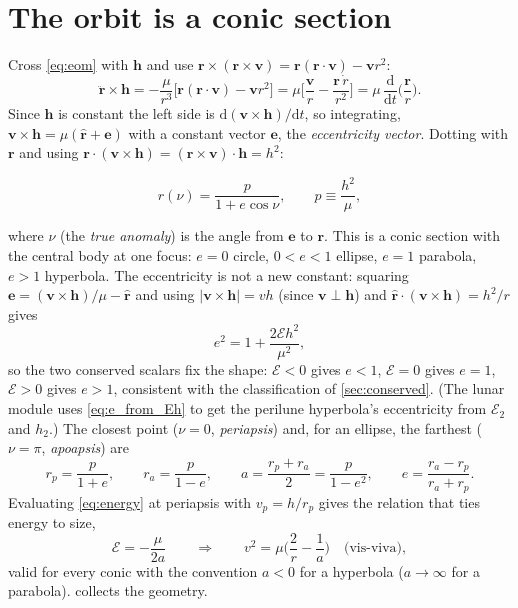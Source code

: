\documentclass[11pt,letterpaper,oneside]{report}
\newcommand{\En}{\mathcal E}
\newcommand{\dd}{\mathrm{d}}
\newcommand{\bv}[1]{\bm{#1}}
\newcommand{\uv}[1]{\hat{\bm{#1}}}
\begin{document}
\section{The orbit is a conic section}
Cross \cref{eq:eom} with $\bv h$ and use $\bv r\times(\bv r\times\bv v)=\bv r(\bv r\cdot\bv v)-\bv v r^2$:
\[
\ddot{\bv r}\times\bv h = -\frac{\mu}{r^3}\big[\bv r(\bv r\cdot\bv v)-\bv v r^2\big]
= \mu\Big[\frac{\bv v}{r}-\frac{\bv r\,\dot r}{r^2}\Big] = \mu\,\frac{\dd}{\dd t}\Big(\frac{\bv r}{r}\Big).
\]
Since $\bv h$ is constant the left side is $\dd(\bv v\times\bv h)/\dd t$, so integrating,
$\bv v\times\bv h = \mu(\uv r+\bv e)$ with a constant vector $\bv e$, the \emph{eccentricity
vector}. Dotting with $\bv r$ and using $\bv r\cdot(\bv v\times\bv h)=(\bv r\times\bv v)\cdot\bv h=h^2$:
\begin{keyresult}
\begin{equation}
  r(\nu)=\frac{p}{1+e\cos\nu},\qquad p\equiv\frac{h^2}{\mu},
  \label{eq:conic}
\end{equation}
\end{keyresult}
where $\nu$ (the \emph{true anomaly}) is the angle from $\bv e$ to $\bv r$. This is a conic section
with the central body at one focus: $e=0$ circle, $0<e<1$ ellipse, $e=1$ parabola, $e>1$
hyperbola. The eccentricity is not a new constant: squaring $\bv e=(\bv v\times\bv h)/\mu-\uv r$
and using $|\bv v\times\bv h|=vh$ (since $\bv v\perp\bv h$) and $\uv r\cdot(\bv v\times\bv h)=h^2/r$ gives
\begin{equation}
  e^2=1+\frac{2\En h^2}{\mu^2},
  \label{eq:e_from_Eh}
\end{equation}
so the two conserved scalars fix the shape: $\En<0$ gives $e<1$, $\En=0$ gives $e=1$, $\En>0$ gives
$e>1$, consistent with the classification of \cref{sec:conserved}. (The lunar module uses
\cref{eq:e_from_Eh} to get the perilune hyperbola's eccentricity from $\En_2$ and $h_2$.) The closest point ($\nu=0$, \emph{periapsis}) and, for an ellipse, the farthest
($\nu=\pi$, \emph{apoapsis}) are
\begin{equation}
  r_p=\frac{p}{1+e},\qquad r_a=\frac{p}{1-e},\qquad a=\frac{r_p+r_a}{2}=\frac{p}{1-e^2},\qquad
  e=\frac{r_a-r_p}{r_a+r_p}.
\end{equation}
Evaluating \cref{eq:energy} at periapsis with $v_p=h/r_p$ gives the relation that ties energy to size,
\begin{equation}
  \En=-\frac{\mu}{2a}\qquad\Longrightarrow\qquad v^2=\mu\Big(\frac{2}{r}-\frac{1}{a}\Big)\quad\text{(vis-viva)},
  \label{eq:visviva}
\end{equation}
valid for every conic with the convention $a<0$ for a hyperbola ($a\to\infty$ for a parabola).
 collects the geometry.
\end{document}
